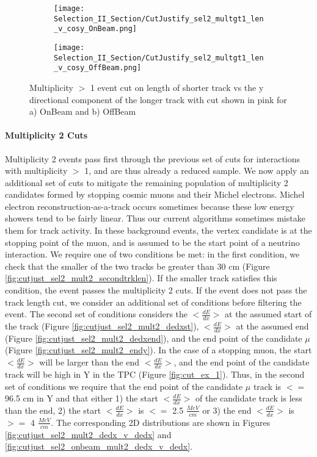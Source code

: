 \begin{figure}[H]
\centering
  \begin{subfigure}[t]{0.25\textwidth}
    \centering
\texttt{[image: Selection\_II\_Section/CutJustify\_sel2\_multgt1\_len\_v\_cosy\_OnBeam.png]}
 \caption{ }
  \end{subfigure} 
  \hspace{20mm}
  \begin{subfigure}[t]{0.25\textwidth}
    \centering
  \texttt{[image: Selection\_II\_Section/CutJustify\_sel2\_multgt1\_len\_v\_cosy\_OffBeam.png]}
   \caption{ }
  \end{subfigure} 
\caption{ Multiplicity $>$ 1 event cut on length of shorter track vs the y directional component of the longer track with cut shown in pink for a) OnBeam and b) OffBeam }
\label{fig:cutjust_sel2_onbeam_multgt1_len_v_cosy}
\end{figure}

\clearpage
\paragraph{Multiplicity 2 Cuts}
Multiplicity 2 events pass first through the previous set of cuts for interactions with multiplicity $>$ 1, and are thus already a reduced sample. We now apply an additional set of cuts to mitigate the remaining population of multiplicity 2 candidates formed by stopping cosmic muons and their Michel electrons. Michel electron reconstruction-as-a-track occurs sometimes because these low energy showers tend to be fairly linear.  Thus our current algorithms sometimes mistake them for track activity.  In these background events, the vertex candidate is at the stopping point of the muon, and is assumed to be the start point of a neutrino interaction. We require one of two conditions be met: in the first condition, we check that the smaller of the two tracks be greater than 30 cm (Figure \ref{fig:cutjust_sel2_mult2_secondtrklen}). If the smaller track satisfies this condition, the event passes the multiplicity 2 cuts. If the event does not pass the track length cut, we consider an additional set of conditions before filtering the event.  The second set of conditions considers the $<\frac{dE}{dx}>$ at the assumed start of the track (Figure \ref{fig:cutjust_sel2_mult2_dedxst}), $<\frac{dE}{dx}>$ at the assumed end (Figure \ref{fig:cutjust_sel2_mult2_dedxend}), and the end point of the candidate $\mu$ (Figure \ref{fig:cutjust_sel2_mult2_endy}).  In the case of a stopping muon, the start $<\frac{dE}{dx}>$ will be larger than the end $<\frac{dE}{dx}>$, and the end point of the candidate track will be high in Y in the TPC (Figure \ref{fig:cut_ex_1}).  Thus, in the second set of conditions we require that the end point of the candidate $\mu$ track is $<=$ 96.5 cm in Y and that either 1) the start $<\frac{dE}{dx}>$ of the candidate track is less than the end, 2) the start $<\frac{dE}{dx}>$ is $<=$ 2.5 $\frac{MeV}{cm}$ or 3) the end $<\frac{dE}{dx}>$ is $>=$ 4 $\frac{MeV}{cm}$. The corresponding 2D distributions are shown in Figures \ref{fig:cutjust_sel2_mult2_dedx_v_dedx} and \ref{fig:cutjust_sel2_onbeam_mult2_dedx_v_dedx}.

